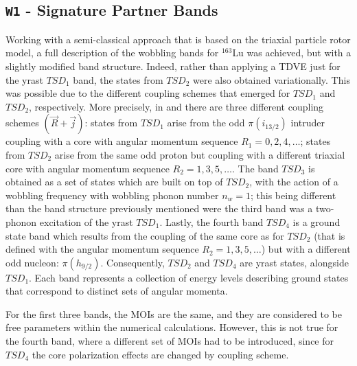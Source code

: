 \documentclass[11pt]{article}
\begin{document}
\subsection{\texttt{W1} - Signature Partner Bands}
\label{subsection:w1}

Working with a semi-classical approach that is based on the triaxial particle rotor model, a full description of the wobbling bands for $^{163}$Lu was achieved, but with a slightly modified band structure. Indeed, rather than applying a TDVE just for the yrast $TSD_1$ band, the states from $TSD_2$ were also obtained variationally. This was possible due to the different coupling schemes that emerged for $TSD_1$ and $TSD_2$, respectively. More precisely, in \cite{raduta2020towards} and \cite{raduta2020approach} there are three different coupling schemes $(\vec{R}+\vec{j})$: states from $TSD_1$ arise from the odd $\pi(i_{13/2})$ intruder coupling with a core with angular momentum sequence $R_1=0,2,4,\dots$; states from $TSD_2$ arise from the same odd proton but coupling with a different triaxial core with angular momentum sequence $R_2=1,3,5,\dots$. The band $TSD_3$ is obtained as a set of states which are built on top of $TSD_2$, with the action of a wobbling frequency with wobbling phonon number $n_w=1$; this being different than the band structure previously mentioned were the third band was a two-phonon excitation of the yrast $TSD_1$. Lastly, the fourth band $TSD_4$ is a ground state band which results from the coupling of the same core as for $TSD_2$ (that is defined with the angular momentum sequence $R_2=1,3,5,\dots$) but with a different odd nucleon: $\pi(h_{9/2})$. Consequently, $TSD_2$ and $TSD_4$ are yrast states, alongside $TSD_1$. Each band represents a collection of energy levels describing ground states that correspond to distinct sets of angular momenta.

For the first three bands, the MOIs are the same, and they are considered to be free parameters within the numerical calculations. However, this is not true for the fourth band, where a different set of MOIs had to be introduced, since for $TSD_4$ the core polarization effects are changed by coupling scheme.
\end{document}
